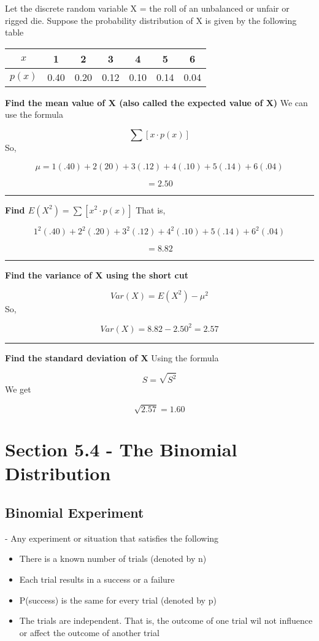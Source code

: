 \documentclass{report}
\begin{document}
    \pagebreak
    \q
    \bigbreak \noindent
    Let the discrete random variable X = the roll of an unbalanced or unfair or rigged die. Suppose the probability distribution of X is given by the following table
    \bigbreak \noindent
   \begin{center}
\begin{tabular}{c|cccccc}
$x$ & 1 & 2 & 3 & 4 & 5 & 6 \\
\hline$p(x)$ & 0.40 & 0.20 & 0.12 & 0.10 & 0.14 & 0.04
\end{tabular}
\end{center}
\bigbreak \noindent \bigbreak \noindent
\textbf{Find the mean value of X (also called the expected value of X)}
\bigbreak \noindent
We can use the formula

$$ \displaystyle\sum\left[x \cdot p(x)\right]$$
So,

  $$\mu  = 1(.40) + 2(20)+ 3(.12)+4(.10)+5(.14)+6(.04)$$

  $$= 2.50$$
  \bigbreak \noindent
  \hrule
  \bigbreak \noindent
  \textbf{Find $E(X^2) = \sum\left[x^2 \cdot p(x)\right]$}
    \bigbreak \noindent
    That is,

   $$  1^2(.40) +2^2(.20)+3^2(.12)+ 4^2(.10)+5(.14)+6^2(.04)$$

   $$= 8.82$$
  \bigbreak \noindent
  \hrule
  \bigbreak \noindent
  \textbf{Find the variance of X using the short cut}
  
  $$ Var(X) = E(X^2) - \mu^{2}$$
  So,

  $$ Var(X) = 8.82 - 2.50^{2} = 2.57$$
  \bigbreak \noindent
  \hrule
  \bigbreak \noindent
  \textbf{Find the standard deviation of X}
  \bigbreak \noindent
  Using the formula

  $$ S = \sqrt{S^2}$$
We get

  $$  \sqrt{2.57} = 1.60$$
\bigbreak \noindent \bigbreak \noindent
\pagebreak
\section*{Section 5.4 - The Binomial Distribution}
\bigbreak\noindent
\subsection*{Binomial Experiment} - Any experiment or situation that satisfies the following
\vspace{2mm}

\begin{itemize}
  \item There is a known number of trials (denoted by n) 
  \item Each trial results in a success or a failure
  \item P(success) is the same for every trial (denoted by p)
  \item The trials are independent. That is, the outcome of one trial wil not influence or affect the outcome of another trial
\bigbreak \noindent
{}
\end{itemize}
\bigbreak \noindent
\end{document}
